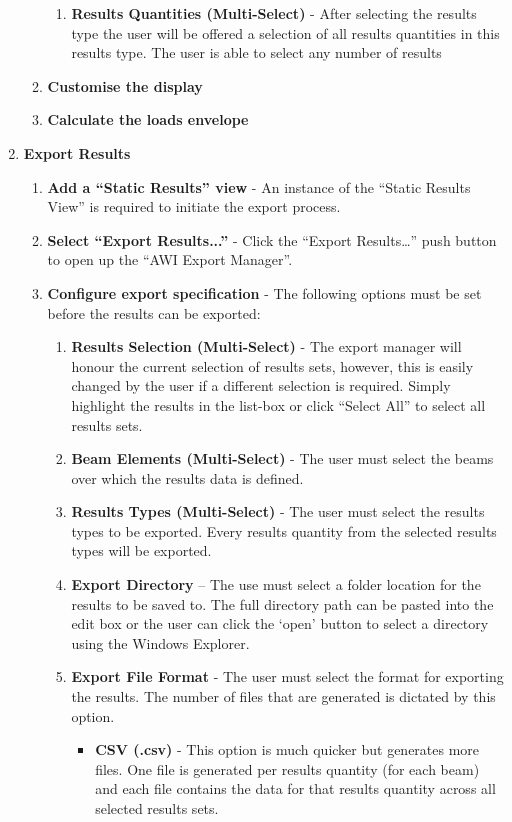 \begin{enumerate}
\begin{enumerate}
\begin{enumerate}
			\item \textbf{Results Quantities (Multi-Select)} - After selecting the results type the user will be offered a selection of all results quantities in this results type. The user is able to select any number of results
		\end{enumerate}
		\item \textbf{Customise the display}
		\item \textbf{Calculate the loads envelope}
	\end{enumerate}
	\item \textbf{Export Results}
	\begin{enumerate}
		\item \textbf{Add a ``Static Results'' view} - An instance of the ``Static Results View'' is required to initiate the export process.
		\item \textbf{Select ``Export Results...''} - Click the ``Export Results…'' push button to open up the ``AWI Export Manager''.
		\item \textbf{Configure export specification} - The following options must be set before the results can be exported:
		\begin{enumerate}
			\item \textbf{Results Selection (Multi-Select)} - The export manager will honour the current selection of results sets, however, this is easily changed by the user if a different selection is required. Simply highlight the results in the list-box or click ``Select All'' to select all results sets.
			\item \textbf{Beam Elements (Multi-Select)} - The user must select the beams over which the results data is defined.
			\item \textbf{Results Types (Multi-Select)} - The user must select the results types to be exported. Every results quantity from the selected results types will be exported.
			\item \textbf{Export Directory} – The use must select a folder location for the results to be saved to. The full directory path can be pasted into the edit box or the user can click the `open' button to select a directory using the Windows Explorer.
			\item \textbf{Export File Format} - The user must select the format for exporting the results. The number of files that are generated is dictated by this option.
			\begin{itemize}
				\item \textbf{CSV (.csv)} - This option is much quicker but generates more files. One file is generated per results quantity (for each beam) and each file contains the data for that results quantity across all selected results sets.

\end{itemize}
\end{enumerate}
\end{enumerate}
\end{enumerate}
